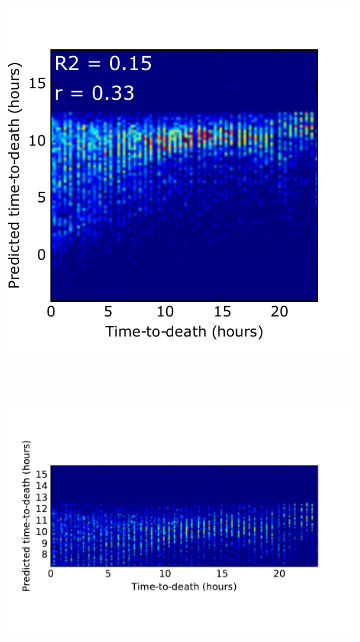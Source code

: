 \documentclass[pdftex,12pt,a4paper]{report}
\begin{document}

\begin{figure}[H]
\centering
\begin{subfigure}{.35\textwidth}
  \centering
  \includegraphics[width=\textwidth]{images/svm/pred_heatmap_full.pdf}
  \caption{}
  \label{fig:svm_pred_heatmap_full}
\end{subfigure}
~
\begin{subfigure}{.62\textwidth}
  \centering
  \includegraphics[width=\textwidth]{images/svm/pred_heatmap.pdf}
  \caption{}
  \label{fig:svm_pred_heatmap}
\end{subfigure}


\end{figure}
\end{document}
